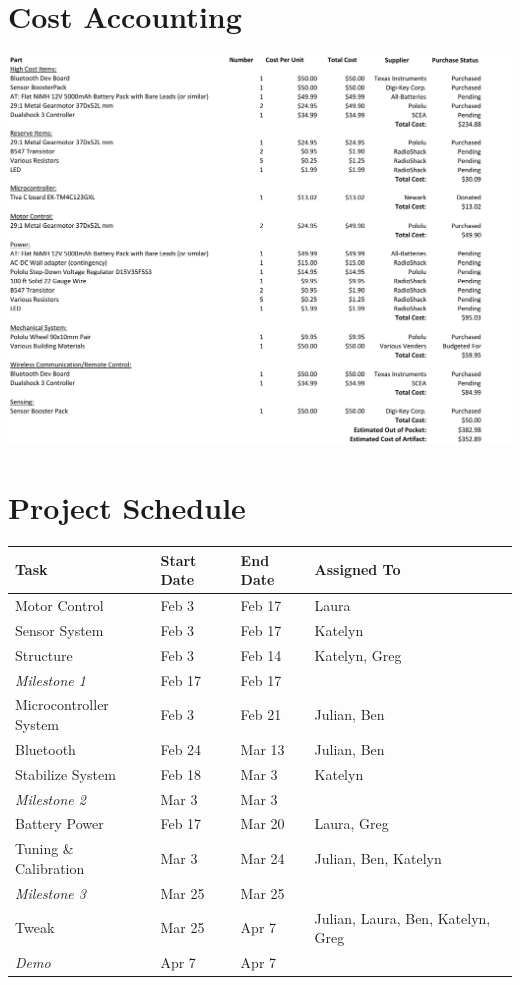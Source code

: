 \documentclass[11pt]{report}
\begin{document}
\begin{spacing}{1.5}
\section*{Cost Accounting} %

    {
    \centering
    \includegraphics[width=\textwidth]{CostAccounting}
    }

\section*{Project Schedule} %

\begin{tabular}{lllll}

Task & Start Date & End Date & Assigned To \\
\hline
Motor Control & Feb 3 & Feb 17 & Laura \\
Sensor System &	Feb 3 &	Feb 17 &			Katelyn \\
Structure	& Feb 3	& Feb 14 &			Katelyn, Greg \\
\textit{Milestone 1}	& Feb 17 &	Feb 17		\\		
Microcontroller System	& Feb 3	& Feb 21 &	 Julian, Ben \\
Bluetooth	& Feb 24 & 	Mar 13	& 	Julian, Ben \\
Stabilize System	& Feb 18	& Mar 3	 	& Katelyn \\
\textit{Milestone 2} &	Mar 3 &	Mar 3	 \\			
Battery Power	& Feb 17 &	Mar 20 &	 Laura, Greg \\
Tuning \& Calibration	& Mar 3	& Mar 24 &		Julian, Ben, Katelyn \\
\textit{Milestone 3}	& Mar 25	& Mar 25				 \\
Tweak	& Mar 25 &	Apr 7 &	Julian, Laura, Ben, Katelyn, Greg \\
\textit{Demo} & Apr 7 & Apr 7 \\				



\end{tabular}
\end{spacing}
\end{document}

